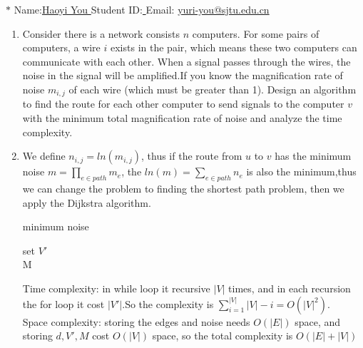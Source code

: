 \documentclass[12pt,a4paper]{article}
\makeatletter
\newtheorem*{solution}{Solution}
\theoremstyle{definition}
\renewenvironment{solution}[1][Solution] {\par\pushQED{\qed}\normalfont\topsep6\p@\@plus6\p@\relax\trivlist\item[\hskip\labelsep\bfseries#1\@addpunct{.}]\ignorespaces}{\popQED\endtrivlist\@endpefalse} \makeatother
\makeatother
\begin{document}
\noindent

\noindent{}
\begin{center}
\footnotesize{\color{blue}$*$ Name:\underline{\quad   Haoyi You  \quad  }\quad Student ID:\underline{ \quad} \quad Email: \underline{\quad yuri-you@sjtu.edu.cn \quad}}
\end{center}

\begin{enumerate}
    \item  Consider there is a network consists $n$ computers. For some pairs of computers, a wire $i$ exists in the pair, which means these two computers can communicate with each other. When a signal passes through the wires, the noise in the signal will be amplified.If you know the magnification rate of noise $m_{i,j}$ of each wire (which must be greater than 1). Design an algorithm to find the route  for each other computer to send signals to the computer $v$ with the minimum total magnification rate of noise and analyze the time complexity.
    \begin{solution}
    We define $n_{i,j}=ln(m_{i,j})$, thus if the route from $u$ to $v$ has the minimum noise $m=\prod \limits_{e\in path}m_e$, the $ln(m)=\sum \limits_{e\in path}n_e$ is also the minimum,thus we can change the problem to finding the shortest path problem, then we apply the Dijkstra algorithm.\\
    	\begin{algorithm}[H]
		
		\BlankLine
		\caption{minimum noise}\label{noise}
		set $V'$\\
		\Return M
	\end{algorithm}
	Time complexity: in while loop it recursive $|V|$ times, and in each recursion the for loop it cost $|V'|$.So the complexity is $\sum \limits_{i=1}^{|V|}|V|-i=O(|V|^2)$.\\
	Space complexity: storing the edges and noise needs $O(|E|)$ space, and storing $d,V',M$ cost $O(|V|)$ space, so the total complexity is $O(|E|+|V|)$
    \end{solution}
	

\end{enumerate}
\end{document}
